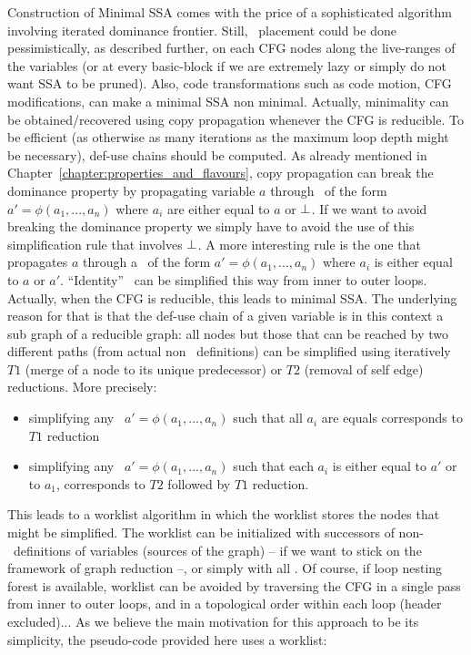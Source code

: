 Construction of Minimal SSA comes with the price of a sophisticated algorithm involving iterated dominance frontier. 
Still, \phiops\ placement could be done pessimistically, as described further, on each CFG nodes along the live-ranges of the variables (or at every basic-block if we are extremely lazy or simply do not want SSA to be pruned). 
Also, code transformations such as code motion, CFG modifications, can make a minimal SSA non minimal.
Actually, minimality can be obtained/recovered using copy propagation whenever the CFG is reducible. 
To be efficient (as otherwise as many iterations as the maximum loop depth might be necessary), def-use chains should be computed. 
As already mentioned in Chapter~\ref{chapter:properties_and_flavours}, copy propagation can break the dominance property by propagating variable $a$ through \phiops\ of the form $a'=\phi(a_1,...,a_n)$ where $a_i$ are either equal to $a$ or $\perp$. 
If we want to avoid breaking the dominance property we simply have to avoid the use of this simplification rule that involves $\perp$. 
A more interesting rule is the one that propagates $a$ through a \phiop\ of the form $a'=\phi(a_1,...,a_n)$ where $a_i$ is either equal to $a$ or $a'$. 
``Identity'' \phiops\ can be simplified this way from inner to outer loops. 
Actually, when the CFG is reducible, this leads to minimal SSA. 
The underlying reason for that is that the def-use chain of a given variable is in this context a sub graph of a reducible graph: 
all nodes but those that can be reached by two different paths (from actual non \phiops\ definitions) can be simplified using iteratively $T1$ (merge of a node to its unique predecessor) or $T2$ (removal of self edge) reductions.
More precisely:
\begin{itemize}
\item simplifying any \phiop\ $a'=\phi(a_1,...,a_n)$ such that all $a_i$ are equals corresponds to $T1$ reduction
\item simplifying any \phiop\ $a'=\phi(a_1,...,a_n)$ such that each $a_i$ is either equal to $a'$ or to $a_1$, corresponds to $T2$ followed by $T1$ reduction.
\end{itemize}
This leads to a worklist algorithm in which the worklist stores the nodes that might be simplified. The worklist can be initialized with successors of non-\phiops\ definitions of variables (sources of the graph) -- if we want to stick on the framework of graph reduction --, or simply with all \phiops. Of course, if loop nesting forest is available, worklist can be avoided by traversing the CFG in a single pass from inner to outer loops, and in a topological order within each loop (header excluded)... 
As we believe the main motivation for this approach to be its simplicity, the pseudo-code provided here uses a worklist:

